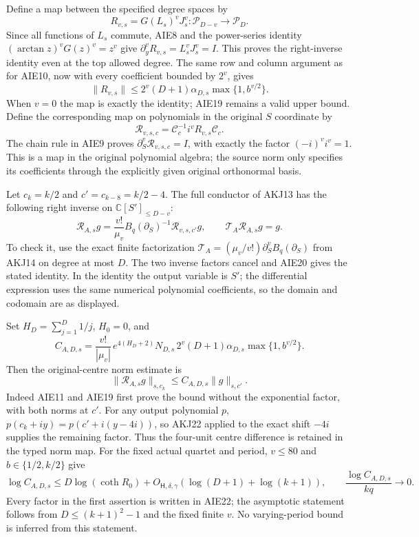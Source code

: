 \documentclass[11pt,a4paper]{article}
\begin{document}
Define a map between the specified degree spaces by
\[
 R_{v,s}=G(L_s)^v J_s^v:\mathcal P_{D-v}\longrightarrow\mathcal P_D.
 \tag{AIE18}
\]
Since all functions of $L_s$ commute, AIE8 and the power-series
identity $(\arctan z)^vG(z)^v=z^v$ give
$\partial_y^vR_{v,s}=L_s^vJ_s^v=I$. This proves the right-inverse
identity even at the top allowed degree. The same row and column
argument as for AIE10, now with every coefficient bounded by $2^v$,
gives
\[
 \|R_{v,s}\|\le
   2^v(D+1)\alpha_{D,s}\max\{1,b^{v/2}\}.
 \tag{AIE19}
\]
When $v=0$ the map is exactly the identity; AIE19 remains a valid
upper bound. Define the corresponding map on polynomials in the
original $S$ coordinate by
\[
 \mathcal R_{v,s,c}
       =\mathcal C_c^{-1}i^vR_{v,s}\mathcal C_c.
 \tag{AIE20}
\]
The chain rule in AIE9 proves
$\partial_S^v\mathcal R_{v,s,c}=I$, with exactly the factor
$(-i)^vi^v=1$. This is a map in the original polynomial algebra;
the source norm only specifies its coefficients through the explicitly
given original orthonormal basis.

Let $c_k=k/2$ and $c'=c_{k-8}=k/2-4$. The full conductor of AKJ13
has the following right inverse on $\mathbb C[S']_{\le D-v}$:
\[
 \mathcal R_{A,s}g
     =\frac{v!}{\mu_v}
             B_q(\partial_S)^{-1}\mathcal R_{v,s,c'}g,
 \qquad \mathcal T_A\mathcal R_{A,s}g=g.
 \tag{AIE21}
\]
To check it, use the exact finite factorization
$\mathcal T_A=(\mu_v/v!)\partial_S^vB_q(\partial_S)$ from
AKJ14 on degree at most $D$. The two inverse factors cancel and
AIE20 gives the stated identity. In the identity the output variable
is $S'$; the differential expression uses the same numerical
polynomial coefficients, so the domain and codomain are as displayed.

Set $H_D=\sum_{j=1}^D1/j$, $H_0=0$, and
\[
 C_{A,D,s}=\frac{v!}{|\mu_v|}\,
  e^{4(H_D+2)}N_{D,s}\,
  2^v(D+1)\alpha_{D,s}\max\{1,b^{v/2}\}.
 \tag{AIE22}
\]
Then the original-centre norm estimate is
\[
 \|\mathcal R_{A,s}g\|_{s,c_k}
                    \le C_{A,D,s}\|g\|_{s,c'}.
 \tag{AIE23}
\]
Indeed AIE11 and AIE19 first prove the bound without the exponential
factor, with both norms at $c'$. For any output polynomial $p$,
$p(c_k+iy)=p(c'+i(y-4i))$, so AKJ22 applied to the exact shift
$-4i$ supplies the remaining factor. Thus the four-unit centre
difference is retained in the typed norm map. For the fixed actual
quartet and period, $v\le80$ and $b\in\{1/2,k/2\}$ give
\[
 \log C_{A,D,s}
 \le D\log(\coth R_0)+O_{\mathsf H,\delta,\gamma}
                         (\log(D+1)+\log(k+1)),
 \qquad \frac{\log C_{A,D,s}}{kq}\longrightarrow0.
 \tag{AIE24}
\]
Every factor in the first assertion is written in AIE22; the
asymptotic statement follows from $D\le(k+1)^2-1$ and the fixed
finite $v$. No varying-period bound is inferred from this statement.
\end{document}
